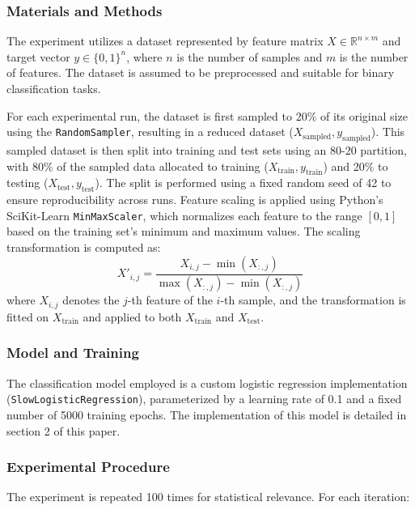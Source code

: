 \documentclass{article}
\theoremstyle{plain}
\theoremstyle{definition}
\theoremstyle{remark}
\begin{document}
\subsubsection{Materials and Methods}

The experiment utilizes a dataset represented by feature matrix $ X \in \mathbb{R}^{n \times m} $ and target vector $ y \in \{0, 1\}^n $, where $ n $ is the number of samples and $ m $ is the number of features. The dataset is assumed to be preprocessed and suitable for binary classification tasks.

For each experimental run, the dataset is first sampled to 20\% of its original size using the \texttt{RandomSampler}, resulting in a reduced dataset ($ X_{\text{sampled}}, y_{\text{sampled}} $). This sampled dataset is then split into training and test sets using an 80-20 partition, with 80\% of the sampled data allocated to training ($ X_{\text{train}}, y_{\text{train}} $) and 20\% to testing ($ X_{\text{test}}, y_{\text{test}} $). The split is performed using a fixed random seed of 42 to ensure reproducibility across runs. Feature scaling is applied using Python's SciKit-Learn \texttt{MinMaxScaler}, which normalizes each feature to the range $[0, 1]$ based on the training set's minimum and maximum values. The scaling transformation is computed as:
\[
X'_{i,j} = \frac{X_{i,j} - \min(X_{:,j})}{\max(X_{:,j}) - \min(X_{:,j})}
\]
where $ X_{i,j} $ denotes the $ j $-th feature of the $ i $-th sample, and the transformation is fitted on $ X_{\text{train}} $ and applied to both $ X_{\text{train}} $ and $ X_{\text{test}} $.

\subsubsection{Model and Training}

The classification model employed is a custom logistic regression implementation (\texttt{SlowLogisticRegression}), parameterized by a learning rate of 0.1 and a fixed number of 5000 training epochs. The implementation of this model is detailed in section 2 of this paper.

\subsubsection{Experimental Procedure}

The experiment is repeated 100 times for statistical relevance. For each iteration:
\end{document}
